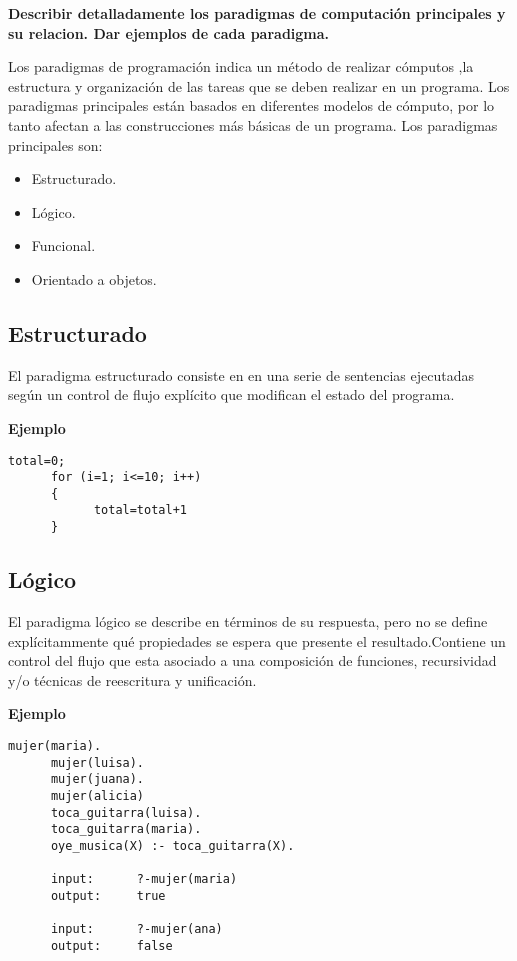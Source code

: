 \item \textbf{Describir detalladamente los paradigmas de computación principales y su relacion. Dar ejemplos de cada paradigma.}

Los paradigmas de programación indica un método de realizar cómputos ,la estructura y organización de las tareas que se deben realizar en un programa. Los paradigmas principales están basados en diferentes modelos de cómputo, por lo tanto afectan a las construcciones más básicas de un programa. Los paradigmas principales son:

\begin{itemize}
      \item Estructurado.
      \item Lógico.
      \item Funcional.
      \item Orientado a objetos.
\end{itemize}
\subsection*{Estructurado}
El paradigma estructurado consiste en en una serie de sentencias ejecutadas según un control de flujo explícito que modifican el estado del programa.\cite{rodriguez_2003}

\textbf{Ejemplo}

\begin{lstlisting}[style=CStyle]
      total=0;
      for (i=1; i<=10; i++)
      {
            total=total+1
      }
\end{lstlisting}
\subsection*{Lógico}
El paradigma lógico se describe en términos de su respuesta, pero no se define explícitammente qué propiedades se espera que presente el resultado\cite{Daintith_2008}.Contiene un control del flujo que esta asociado a una composición de funciones, recursividad y/o técnicas de reescritura y unificación.\cite{satori_2021,bratko_2012}

\textbf{Ejemplo}

\begin{lstlisting}[style=CStyle]
      mujer(maria).
      mujer(luisa).
      mujer(juana).
      mujer(alicia)
      toca_guitarra(luisa).
      toca_guitarra(maria).
      oye_musica(X) :- toca_guitarra(X).

      input:      ?-mujer(maria)
      output:     true

      input:      ?-mujer(ana)
      output:     false
\end{lstlisting}
